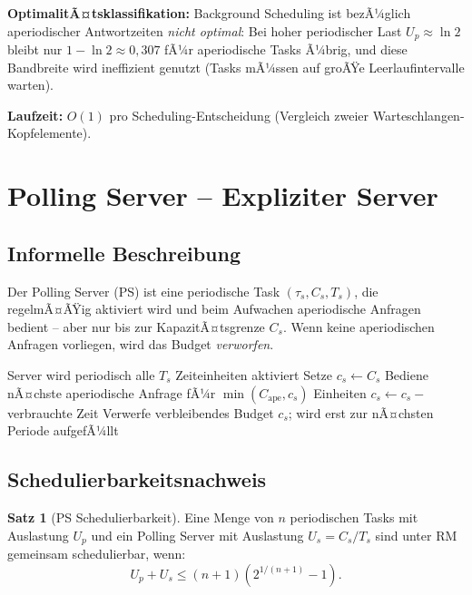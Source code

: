 ﻿\documentclass[a4paper,12pt]{report}
\theoremstyle{definition}
\newtheorem{satz}{Satz}[chapter]
\begin{document}
\textbf{OptimalitÃ¤tsklassifikation:} Background Scheduling ist bezÃ¼glich
aperiodischer Antwortzeiten \emph{nicht optimal}: Bei hoher periodischer Last
$U_p \approx \ln 2$ bleibt nur $1 - \ln 2 \approx 0{,}307$ fÃ¼r aperiodische
Tasks Ã¼brig, und diese Bandbreite wird ineffizient genutzt (Tasks mÃ¼ssen auf
groÃŸe Leerlaufintervalle warten).

\textbf{Laufzeit:} $O(1)$ pro Scheduling-Entscheidung (Vergleich zweier
Warteschlangen-Kopfelemente).

\section{Polling Server -- Expliziter Server}

\subsection{Informelle Beschreibung}

Der Polling Server (PS) ist eine periodische Task $(\tau_s, C_s, T_s)$, die
regelmÃ¤ÃŸig aktiviert wird und beim Aufwachen aperiodische Anfragen bedient
-- aber nur bis zur KapazitÃ¤tsgrenze $C_s$. Wenn keine aperiodischen Anfragen
vorliegen, wird das Budget \emph{verworfen}.

\begin{algorithm}[H]
	\caption{Polling Server}
	\begin{algorithmic}[1]
		\State Server wird periodisch alle $T_s$ Zeiteinheiten aktiviert
		\State Setze $c_s \leftarrow C_s$ 
		\State Bediene nÃ¤chste aperiodische Anfrage fÃ¼r $\min(C_{\text{ape}}, c_s)$ Einheiten
		\State $c_s \leftarrow c_s - $ verbrauchte Zeit
		\EndWhile
		\State Verwerfe verbleibendes Budget $c_s$; wird erst zur nÃ¤chsten Periode aufgefÃ¼llt
	\end{algorithmic}
\end{algorithm}

\subsection{Schedulierbarkeitsnachweis}

\begin{satz}[PS Schedulierbarkeit]
	\label{satz:ps}
	Eine Menge von $n$ periodischen Tasks mit Auslastung $U_p$ und ein Polling
	Server mit Auslastung $U_s = C_s/T_s$ sind unter RM gemeinsam schedulierbar,
	wenn:
	\[
		U_p + U_s \leq (n+1)\left(2^{1/(n+1)} - 1\right).
	\]
\end{satz}
\end{document}
